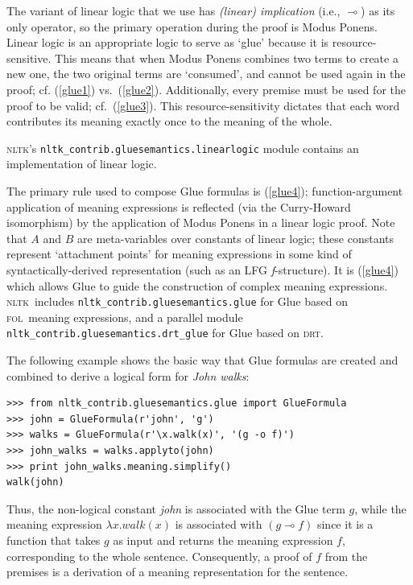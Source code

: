 \documentclass[11pt, a4paper]{article}
\newcommand{\DRT}{\textsc{drt}}
\newcommand{\FOL}{\textsc{fol}}
\newcommand{\NLTK}{\textsc{nltk}}
\begin{document}
The variant of linear logic that we use has \emph{(linear)
  implication} (i.e., $\multimap$)  as its
only operator, so the primary operation during the proof is Modus
Ponens.  Linear logic is an appropriate logic to serve as `glue'
because it is resource-sensitive.  This means that when Modus Ponens
combines two terms to create a new one, the two original
terms are `consumed', and cannot be used again in the proof;
cf. (\ref{glue1}) vs.\ (\ref{glue2}).
Additionally, every premise must be used for the proof to be valid;
cf.\ (\ref{glue3}).
This resource-sensitivity dictates that each word contributes its
meaning exactly once to the meaning of the whole.

\NLTK's \texttt{nltk\_contrib.gluesemantics.linearlogic} module
contains an implementation of linear logic. 

The primary rule used to compose Glue formulas is (\ref{glue4});
function-argument application of meaning expressions is reflected (via
the Curry-Howard isomorphism) by the application of Modus Ponens in a
linear logic proof. Note that $A$ and $B$ are meta-variables over
constants of linear logic; these constants represent `attachment
points' for meaning expressions in some kind of syntactically-derived
representation (such as an LFG \textit{f}-structure).  It is
(\ref{glue4}) which allows Glue to guide the construction of complex
meaning expressions.   \NLTK\ includes
\texttt{nltk\_contrib.gluesemantics.glue} for Glue based on \FOL\
meaning expressions, and a parallel module
\texttt{nltk\_contrib.gluesemantics.drt\_glue} for Glue based on
\DRT.

The following example shows the basic way that
Glue formulas are created and combined to derive a logical form for
\textit{John walks}: 

\begin{Verbatim}
>>> from nltk_contrib.gluesemantics.glue import GlueFormula
>>> john = GlueFormula(r'john', 'g')
>>> walks = GlueFormula(r'\x.walk(x)', '(g -o f)')
>>> john_walks = walks.applyto(john)
>>> print john_walks.meaning.simplify()
walk(john)
\end{Verbatim}
Thus, the non-logical constant \textit{john} is associated with the
Glue term $g$, while the meaning expression $\lambda x.walk(x)$ is
associated with $(g \multimap f)$ since it is a function that
takes $g$ as input and returns the meaning expression $f$,
corresponding to the whole
sentence.  Consequently, a proof of $f$ from the premises is a derivation
of a meaning representation for the sentence.
\end{document}
